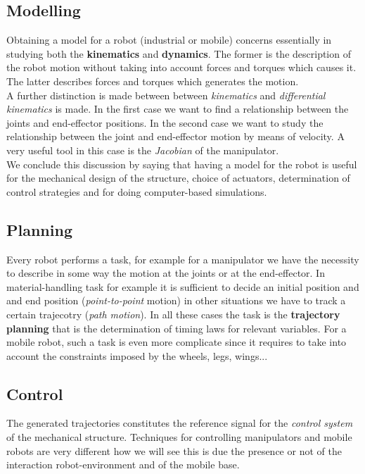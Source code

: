 \subsection{Modelling}
Obtaining a model for a robot (industrial or mobile) concerns essentially in studying both the \textbf{kinematics} and \textbf{dynamics}. The former is the description of the robot motion without taking into account forces and torques which causes it. The latter describes forces and torques which generates the motion.\\
A further distinction is made between between \textit{kinematics} and \textit{differential kinematics} is made. In the first case we want to find a relationship between the joints and end-effector positions. In the second case we want to study the relationship between the joint and end-effector motion by means of velocity. A very useful tool in this case is the \textit{Jacobian} of the manipulator.\\
We conclude this discussion by saying that having a model for the robot is useful for the mechanical design of the structure, choice of actuators, determination of control strategies and for doing computer-based simulations.
\vspace{-0.3cm}
\subsection{Planning}
Every robot performs a task, for example for a manipulator we have the necessity to describe in some way the motion at the joints or at the end-effector. In material-handling task for example it is sufficient to decide an initial position and and end position (\textit{point-to-point} motion) in other situations we have to track a certain trajecotry (\textit{path motion}). In all these cases the task is the \textbf{trajectory planning} that is the determination of timing laws for relevant variables. For a mobile robot, such a task is even more complicate since it requires to take into account the constraints imposed by the wheels, legs, wings...
\vspace{-0.3cm}
\subsection{Control}
The generated trajectories constitutes the reference signal for the \textit{control system} of the mechanical structure. Techniques for controlling manipulators and mobile robots are very different how we will see this is due the presence or not of the interaction robot-environment and of the mobile base.

